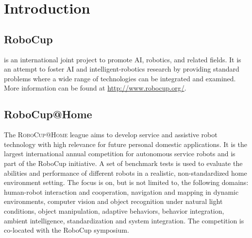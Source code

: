 \chapter{Introduction}
\label{chap:introduction}


\section{RoboCup}

\RoboCup{} is an international joint project to promote AI, robotics, and related fields.
It is an attempt to foster AI and intelligent-robotics research by providing standard problems where a wide range of technologies can be integrated and examined. More information can be found at \url{http://www.robocup.org/}.

\section{RoboCup@Home}

The \textsc{RoboCup@Home} league aims to develop service and assistive robot technology with high relevance for future personal domestic applications.
It is the largest international annual competition for autonomous service robots and is part of the RoboCup initiative.
A set of benchmark tests is used to evaluate the abilities and performance of different robots in a realistic, non-standardized home environment setting.
The focus is on, but is not limited to, the following domains: human-robot interaction and cooperation, navigation and mapping in dynamic environments, computer vision and object recognition under natural light conditions, object manipulation, adaptive behaviors, behavior integration, ambient intelligence, standardization and system integration.
The competition is co-located with the RoboCup symposium.











